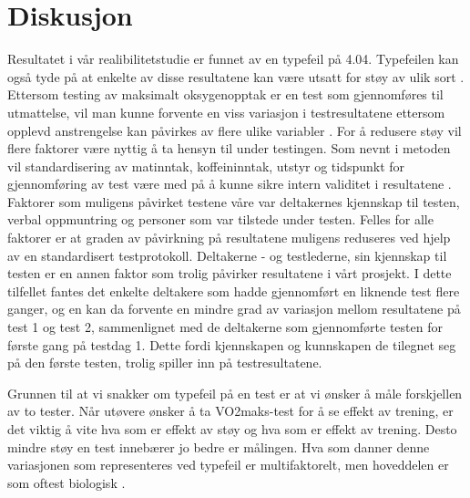 \documentclass[
]{book}
\begin{document}
\hypertarget{diskusjon}{%
\section{Diskusjon}\label{diskusjon}}

Resultatet i vår realibilitetstudie er funnet av en typefeil på 4.04. Typefeilen kan også tyde på at enkelte av disse resultatene kan være utsatt for støy av ulik sort \citep{hopkins2000}. Ettersom testing av maksimalt oksygenopptak er en test som gjennomføres til utmattelse, vil man kunne forvente en viss variasjon i testresultatene ettersom opplevd anstrengelse kan påvirkes av flere ulike variabler \citep{halperin2015}. For å redusere støy vil flere faktorer være nyttig å ta hensyn til under testingen. Som nevnt i metoden vil standardisering av matinntak, koffeininntak, utstyr og tidspunkt for gjennomføring av test være med på å kunne sikre intern validitet i resultatene \citep{halperin2015}. Faktorer som muligens påvirket testene våre var deltakernes kjennskap til testen, verbal oppmuntring og personer som var tilstede under testen\citep{halperin2015}. Felles for alle faktorer er at graden av påvirkning på resultatene muligens reduseres ved hjelp av en standardisert testprotokoll. Deltakerne - og testlederne, sin kjennskap til testen er en annen faktor som trolig påvirker resultatene i vårt prosjekt. I dette tilfellet fantes det enkelte deltakere som hadde gjennomført en liknende test flere ganger, og en kan da forvente en mindre grad av variasjon mellom resultatene på test 1 og test 2, sammenlignet med de deltakerne som gjennomførte testen for første gang på testdag 1. Dette fordi kjennskapen og kunnskapen de tilegnet seg på den første testen, trolig spiller inn på testresultatene.

Grunnen til at vi snakker om typefeil på en test er at vi ønsker å måle forskjellen av to tester. Når utøvere ønsker å ta VO2maks-test for å se effekt av trening, er det viktig å vite hva som er effekt av støy og hva som er effekt av trening. Desto mindre støy en test innebærer jo bedre er målingen. Hva som danner denne variasjonen som representeres ved typefeil er multifaktorelt, men hoveddelen er som oftest biologisk \citep{hopkins2000}.
\end{document}
